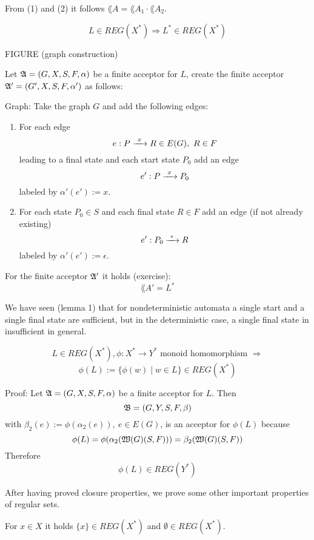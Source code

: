 From (1) and (2) it follows $\lang{A} = \lang{A}_1 \cdot
\lang{A}_2$.

\begin{theorem}
\[ L \in REG(X^*) \Rightarrow L^* \in REG(X^*) \]
\end{theorem}

FIGURE (graph construction)

Let $\mbox{$\mathfrak{A}$} = (G, X, S, F, \alpha)$	be a finite acceptor for $L$, create the
finite acceptor $\mbox{$\mathfrak{A'}$} = (G', X, S, F, \alpha')$ as follows:

Graph: Take the graph $G$ and add the following edges: 

\begin{enumerate}
  \item For each edge \[e : P \xrightarrow{\ {x}\ } R \in E(G),\ R \in F\] leading to a
  final state and each start state $P_0$ add an edge \[e' : P \xrightarrow{\ {x}\ } P_0 \]
  labeled by $\alpha'(e') := x$.
  \item For each state $P_0 \in S$ and each final state $R \in F$ add an edge
  (if not already existing) \[ e' : P_0 \xrightarrow{\ {\epsilon}\ } R \]
  labeled by $\alpha'(e') := \epsilon$.
\end{enumerate}

For the finite acceptor $\mbox{$\mathfrak{A'}$}$ it holds (exercise): \[ \lang{A'} = L^* \]

We have seen (lemma 1) that for nondeterministic automata a single start and a
single final state are sufficient, but in the deterministic case, a single final
state in insufficient in general.

\begin{theorem}
\[ L \in REG(X^*), \phi : X^* \to Y^* \mbox{ monoid homomorphism } \Rightarrow
\]
\[ \phi(L) := \{ \phi(w) \mid w \in L \} \in REG(X^*) \]
\end{theorem}

Proof: Let $\mbox{$\mathfrak{A}$} = (G, X, S, F, \alpha)$ be a finite acceptor for $L$. Then \[
\mbox{$\mathfrak{B}$} = (G, Y, S, F, \beta)\] with $\beta_2(e) := \phi(\alpha_2(e)),\ e \in
E(G)$, is an acceptor for $\phi(L)$ because \[\phi(L) =
\phi(\alpha_2(\mbox{$\mathfrak{W}(G)$}(S, F))) = \beta_2(\mbox{$\mathfrak{W}(G)$}(S,F))\]
Therefore \[ \phi(L) \in REG(Y^*) \]

After having proved closure properties, we prove some other important properties
of regular sets.

\begin{lemma}
For $x \in X$ it holds $\{ x \} \in REG(X^*)$ and $\emptyset \in REG(X^*)$.
\end{lemma}

